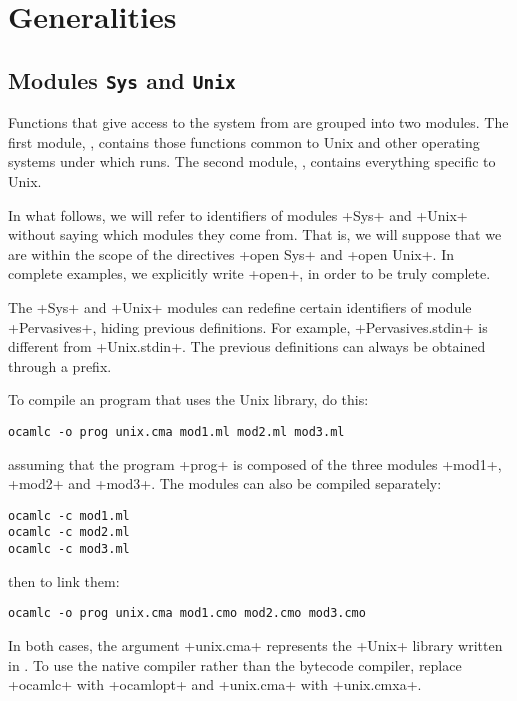 %
%

\chapter{Generalities}

\section{Modules {\normalfont\texttt{Sys}} and {\normalfont\texttt{Unix}}}

Functions that give access to the system from {\ocaml} are grouped into two
modules. The first module,  , contains those functions
common to Unix and other operating systems under which {\ocaml} runs.
The second module, , contains everything specific to
Unix. 

In what follows, we will refer to identifiers of modules \ml+Sys+ and
\ml+Unix+ without saying which modules they come from.  That is, we
will suppose that we are within the scope of the directives 
\ml+open Sys+ and \ml+open Unix+. In complete examples, we explicitly write
\ml+open+, in order to be truly complete.

The \ml+Sys+ and \ml+Unix+ modules can redefine certain
identifiers of module \ml+Pervasives+, hiding previous
definitions. For example,  \ml+Pervasives.stdin+  is different from 
\ml+Unix.stdin+. The previous definitions can always be obtained
through a prefix.

To compile an {\ocaml} program that uses the 
Unix library, do this:
%
\begin{lstlisting}
ocamlc -o prog unix.cma mod1.ml mod2.ml mod3.ml 
\end{lstlisting}
%
assuming that the program  \ml+prog+ is composed of the three modules  \ml+mod1+,
\ml+mod2+ and \ml+mod3+. The modules can also be compiled separately:
%
\begin{lstlisting}
ocamlc -c mod1.ml
ocamlc -c mod2.ml
ocamlc -c mod3.ml
\end{lstlisting}
%
then to link them:
%
\begin{lstlisting}
ocamlc -o prog unix.cma mod1.cmo mod2.cmo mod3.cmo
\end{lstlisting}
%
In both cases, the argument \ml+unix.cma+ represents the \ml+Unix+
library written in {\ocaml}. To use the native compiler rather than the bytecode
compiler, replace \ml+ocamlc+ with \ml+ocamlopt+ and \ml+unix.cma+ with
\ml+unix.cmxa+.

